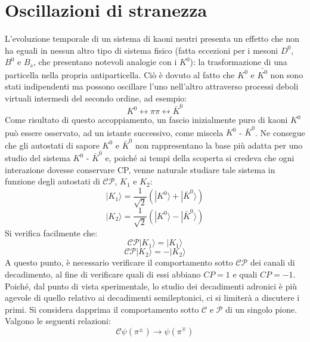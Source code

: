 \section{Oscillazioni di stranezza}
\noindent
L'evoluzione temporale di un sistema di kaoni neutri presenta un effetto che non ha eguali in nessun altro tipo di sistema fisico (fatta eccezioni per i mesoni $D^0$, $B^0$ e 
$B_s$, che presentano notevoli analogie con i $K^0$): la trasformazione di una particella nella propria antiparticella.
Ciò è dovuto al fatto che $K^0$ e $\bar{K^0}$ non sono stati indipendenti ma possono oscillare l'uno nell'altro attraverso processi deboli virtuali intermedi del secondo ordine, ad esempio:
\begin{equation}
 K^0 \leftrightarrow \pi \pi \leftrightarrow \bar{K}^0
\end{equation}
Come risultato di questo accoppiamento, un fascio inizialmente puro di kaoni $K^0$ può essere osservato, ad un istante successivo, come miscela $K^0$ - $\bar{K}^0$.
Ne consegue che gli autostati di sapore $K^0$ e $\bar{K}^0$ non rappresentano la base più adatta per uno studio del sistema $K^0$ - $\bar{K}^0$ e, poiché ai tempi della scoperta
si credeva che ogni interazione dovesse conservare CP, venne naturale studiare tale sistema in funzione degli autostati di $\mathscr{C}\mathscr{P}$, $K_1$ e $K_2$:
\begin{equation}\label{K1}
|K_1\rangle=\frac{1}{\sqrt{2}} (|K^0\rangle + |\bar{K}^0\rangle)
\end{equation}
\begin{equation}\label{K2}
|K_2\rangle=\frac{1}{\sqrt{2}} (|K^0\rangle - |\bar{K}^0\rangle)
\end{equation}
Si verifica facilmente che:
\begin{equation}
 \mathscr{C}\mathscr{P}|K_1\rangle = |K_1\rangle
\end{equation}
\begin{equation}
\mathscr{C}\mathscr{P}|K_2\rangle = -|K_2\rangle 
\end{equation}
A questo punto, è necessario verificare il comportamento sotto $\mathscr{C}\mathscr{P}$ dei canali di decadimento, al fine di verificare quali di essi abbiano $CP = 1$
e quali $CP = -1$. Poiché, dal punto di vista sperimentale, lo studio dei decadimenti adronici è più agevole di quello relativo ai decadimenti semileptonici, ci si limiterà
a discutere i primi. Si considera dapprima il comportamento sotto $\mathscr{C}$ e $\mathscr{P}$ di un singolo pione. Valgono le seguenti relazioni:
\begin{equation}
 \mathscr{C}\psi(\pi^\pm) \rightarrow \psi(\pi^\mp)
\end{equation}
